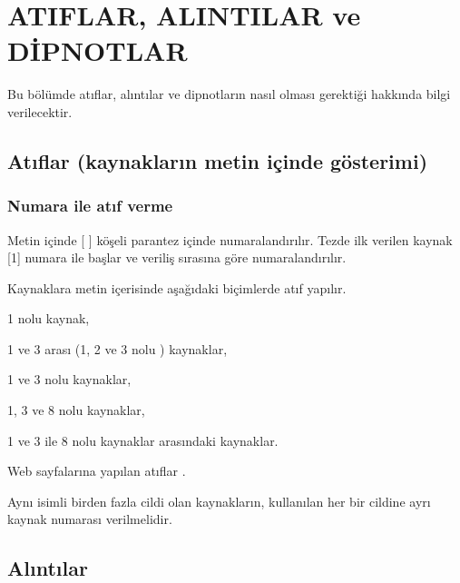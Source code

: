 \chapter{ATIFLAR, ALINTILAR ve DİPNOTLAR}\label{ch:ifnecch4}
Bu bölümde atıflar, alıntılar ve dipnotların nasıl olması gerektiği hakkında bilgi verilecektir.
\section{Atıflar (kaynakların metin içinde gösterimi)}


\subsection{Numara ile atıf verme}

Metin içinde [ ] köşeli parantez içinde numaralandırılır. Tezde ilk verilen kaynak [1] numara ile başlar ve veriliş sırasına göre numaralandırılır.

Kaynaklara metin içerisinde aşağıdaki biçimlerde atıf yapılır.
\cite{Wegener2000629, Zuckerman199486, Wolchik2000843, Burke74, harper2007, unesco, mccaffrey88, moore91}

\cite{Wegener2000629}	1 nolu kaynak,

\cite{Wegener2000629, Zuckerman199486, Wolchik2000843}	1 ve 3 arası (1, 2 ve 3 nolu ) kaynaklar,

\cite{Wegener2000629, Wolchik2000843}	1 ve 3 nolu kaynaklar, 

\cite{Wegener2000629, Wolchik2000843, moore91} 1, 3 ve 8 nolu kaynaklar,

\cite{Wegener2000629, Wolchik2000843, Burke74, harper2007, unesco, mccaffrey88, moore91}	1 ve 3 ile 8 nolu kaynaklar arasındaki kaynaklar.

Web sayfalarına yapılan atıflar \cite{WinNT}. 

Aynı isimli birden fazla cildi olan kaynakların, kullanılan her bir cildine ayrı kaynak numarası verilmelidir. 

\section{Alıntılar}

